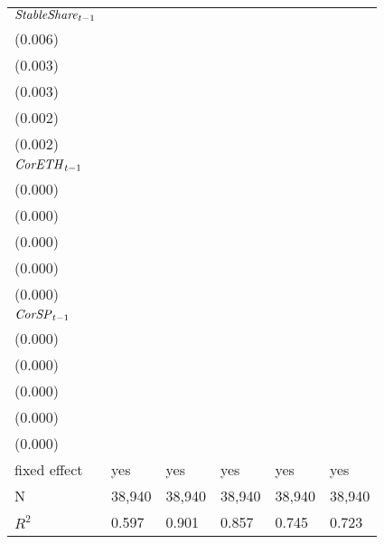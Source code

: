 \begin{tabular}{llllll}
${{\it StableShare}}_{t-1}$  &  \makecell{$0.199^{***}$ \\ (0.006)} &  \makecell{$-0.007^{**}$ \\ (0.003)} &  \makecell{$-0.012^{***}$ \\ (0.003)} &  \makecell{$0.054^{***}$ \\ (0.002)} &   \makecell{$0.029^{***}$ \\ (0.002)} \\
${{\it CorETH}}_{t-1}$       &    \makecell{$-0.000^{}$ \\ (0.000)} &     \makecell{$0.000^{}$ \\ (0.000)} &      \makecell{$0.000^{}$ \\ (0.000)} &    \makecell{$-0.000^{}$ \\ (0.000)} &  \makecell{$-0.000^{***}$ \\ (0.000)} \\
${{\it CorSP}}_{t-1}$        &    \makecell{$-0.000^{}$ \\ (0.000)} &    \makecell{$-0.000^{}$ \\ (0.000)} &     \makecell{$-0.000^{}$ \\ (0.000)} &     \makecell{$0.000^{}$ \\ (0.000)} &    \makecell{$0.000^{**}$ \\ (0.000)} \\
\midrule fixed effect        &                                  yes &                                  yes &                                   yes &                                  yes &                                   yes \\
N                            &                               38,940 &                               38,940 &                                38,940 &                               38,940 &                                38,940 \\
$R^2$                        &                                0.597 &                                0.901 &                                 0.857 &                                0.745 &                                 0.723 \\
\bottomrule
\end{tabular}
